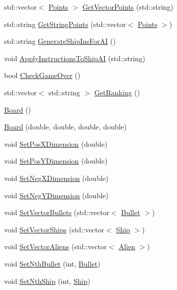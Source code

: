 \begin{DoxyCompactItemize}
\item 
std\-::vector$<$ \hyperlink{structPoints}{Points} $>$ \hyperlink{classBoard_abc68bc633d275a98f6fa8c96c6b07294}{Get\-Vector\-Points} (std\-::string)
\item 
std\-::string \hyperlink{classBoard_a09a953d90a345ec7c373cc3efc0572f6}{Get\-String\-Points} (std\-::vector$<$ \hyperlink{structPoints}{Points} $>$)
\item 
std\-::string \hyperlink{classBoard_a11017929948fe2a12bb8b3dd5c514733}{Generate\-Ship\-Ins\-For\-A\-I} ()
\item 
void \hyperlink{classBoard_a5db019489602fd14039df4c3b76b08d2}{Apply\-Instructions\-To\-Ship\-A\-I} (std\-::string)
\item 
bool \hyperlink{classBoard_ae656233bce0aca3e6a11364f06f02d8d}{Check\-Game\-Over} ()
\item 
std\-::vector$<$ std\-::string $>$ \hyperlink{classBoard_aa62a6d1183307d2c72827b20f69ae722}{Get\-Ranking} ()
\item 
\hyperlink{classBoard_a9ee491d4fea680cf69b033374a9fdfcb}{Board} ()
\item 
\hyperlink{classBoard_a165433da04a8e74a38f12ac2e6bd427b}{Board} (double, double, double, double)
\item 
void \hyperlink{classBoard_a1f3179789d0cdd0693afe8d86231fefa}{Set\-Pos\-X\-Dimension} (double)
\item 
void \hyperlink{classBoard_a3ff5a920c5654a71ce0b5ca746c7c7bb}{Set\-Pos\-Y\-Dimension} (double)
\item 
void \hyperlink{classBoard_a502ea2921d60cd7070a7b09113d29c98}{Set\-Neg\-X\-Dimension} (double)
\item 
void \hyperlink{classBoard_a76e94bf8cf5c9608d0029bd7a48e849e}{Set\-Neg\-Y\-Dimension} (double)
\item 
void \hyperlink{classBoard_a54d9866ac96c6cd290bf33ed20f47b40}{Set\-Vector\-Bullets} (std\-::vector$<$ \hyperlink{classBullet}{Bullet} $>$)
\item 
void \hyperlink{classBoard_a06eb221dbe45442ff706bdbb9e16b5ed}{Set\-Vector\-Ships} (std\-::vector$<$ \hyperlink{classShip}{Ship} $>$)
\item 
void \hyperlink{classBoard_a1aa91f30ab80521b99633a475065ff2e}{Set\-Vector\-Aliens} (std\-::vector$<$ \hyperlink{classAlien}{Alien} $>$)
\item 
void \hyperlink{classBoard_a4ed848f226c934b1b01e42beeeba0df2}{Set\-Nth\-Bullet} (int, \hyperlink{classBullet}{Bullet})
\item 
void \hyperlink{classBoard_a0a547801e0b52fc2dc8ec1875b4c2281}{Set\-Nth\-Ship} (int, \hyperlink{classShip}{Ship})

\end{DoxyCompactItemize}
